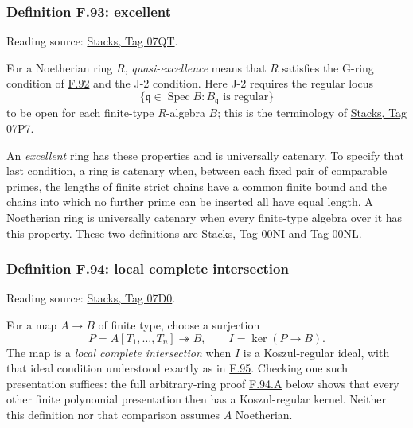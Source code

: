 \documentclass[11pt,a4paper,openany]{report}
\begin{document}
\label{AG-RG-S05-more-algebra-definition-excellent}

\subsubsection{Definition F.93: excellent}\label{AG-RG-S05-definition-f.93-excellent}

Reading source: \href{https://stacks.math.columbia.edu/tag/07QT}{Stacks, Tag 07QT}.

For a Noetherian ring \(R\), \emph{quasi-excellence} means that \(R\) satisfies the G-ring condition of \hyperref[AG-RG-S05-more-algebra-definition-G-ring]{F.92} and the J-2 condition. Here J-2 requires the regular locus \[
\{\mathfrak q\in\operatorname{Spec}B:B_{\mathfrak q}\text{ is regular}\}
\] to be open for each finite-type \(R\)-algebra \(B\); this is the terminology of \href{https://stacks.math.columbia.edu/tag/07P7}{Stacks, Tag 07P7}.

An \emph{excellent} ring has these properties and is universally catenary. To specify that last condition, a ring is catenary when, between each fixed pair of comparable primes, the lengths of finite strict chains have a common finite bound and the chains into which no further prime can be inserted all have equal length. A Noetherian ring is universally catenary when every finite-type algebra over it has this property. These two definitions are \href{https://stacks.math.columbia.edu/tag/00NI}{Stacks, Tag 00NI} and \href{https://stacks.math.columbia.edu/tag/00NL}{Tag 00NL}.

\label{AG-RG-S05-more-algebra-definition-local-complete-intersection}

\subsubsection{Definition F.94: local complete intersection}\label{AG-RG-S05-definition-f.94-local-complete-intersection}

Reading source: \href{https://stacks.math.columbia.edu/tag/07D0}{Stacks, Tag 07D0}.

For a map \(A\to B\) of finite type, choose a surjection \[
P=A[T_1,\ldots,T_n]\twoheadrightarrow B,
\qquad I=\ker(P\to B).
\] The map is a \emph{local complete intersection} when \(I\) is a Koszul-regular ideal, with that ideal condition understood exactly as in \hyperref[AG-RG-S05-more-algebra-definition-regular-ideal]{F.95}. Checking one such presentation suffices: the full arbitrary-ring proof \hyperref[AG-RG-S05-more-algebra-lemma-lci-presentation-independent]{F.94.A} below shows that every other finite polynomial presentation then has a Koszul-regular kernel. Neither this definition nor that comparison assumes \(A\) Noetherian.
\end{document}
